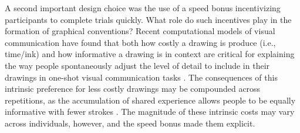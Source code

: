 \documentclass[10pt,letterpaper]{article}
\begin{document}
A second important design choice was the use of a speed bonus incentivizing participants to complete trials quickly.
What role do such incentives play in the formation of graphical conventions?
Recent computational models of visual communication have found that both how costly a drawing is produce (i.e., time/ink) and how informative a drawing is in context are critical for explaining the way people spontaneously adjust the level of detail to include in their drawings in one-shot visual communication tasks \cite{fan2019pragmatic}. 
The consequences of this intrinsic preference for less costly drawings may be compounded across repetitions, as the accumulation of shared experience allows people to be equally informative with fewer strokes \cite{HawkinsFrankGoodman17_ConventionFormation}.
The magnitude of these intrinsic costs may vary across individuals, however, and the speed bonus made them explicit.


\end{document}
